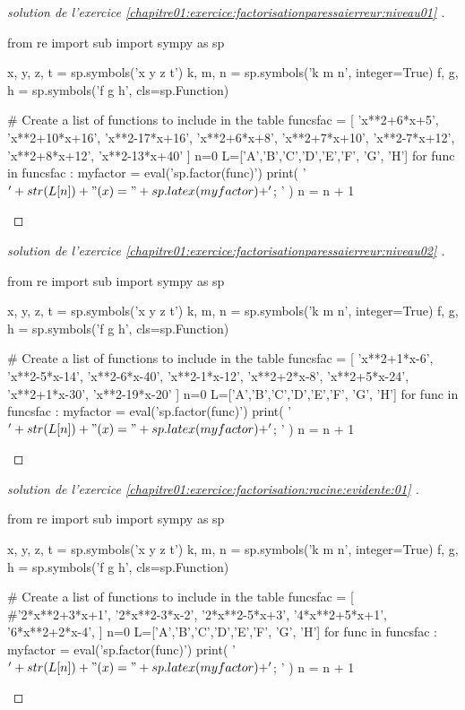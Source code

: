 \documentclass[main.tex]{subfiles}
\begin{document}
\begin{proof}[solution de l'exercice \ref{chapitre01:exercice:factorisationparessaierreur:niveau01} ] \scriptsize
\begin{pycode}
from re import sub
import sympy as sp

x, y, z, t = sp.symbols('x y z t')
k, m, n = sp.symbols('k m n', integer=True)
f, g, h = sp.symbols('f g h', cls=sp.Function)

# Create a list of functions to include in the table
funcsfac = [ 
'x**2+6*x+5',
'x**2+10*x+16',
'x**2-17*x+16',
'x**2+6*x+8',
'x**2+7*x+10', 
'x**2-7*x+12', 
'x**2+8*x+12', 
'x**2-13*x+40'
]
n=0
L=['A','B','C','D','E','F', 'G', 'H']
for func in funcsfac :  
	myfactor =  eval('sp.factor(func)')
	print( '$'+ str(L[n])  + "(x)=" + sp.latex(myfactor) + '$; ' ) 
	n     = n + 1
\end{pycode}
\end{proof}
\begin{proof}[solution de l'exercice \ref{chapitre01:exercice:factorisationparessaierreur:niveau02} ] \scriptsize
\begin{pycode}
from re import sub
import sympy as sp

x, y, z, t = sp.symbols('x y z t')
k, m, n = sp.symbols('k m n', integer=True)
f, g, h = sp.symbols('f g h', cls=sp.Function)

# Create a list of functions to include in the table
funcsfac = [ 
'x**2+1*x-6',
'x**2-5*x-14',
'x**2-6*x-40',
'x**2-1*x-12',
'x**2+2*x-8', 
'x**2+5*x-24', 
'x**2+1*x-30', 
'x**2-19*x-20'
]
n=0
L=['A','B','C','D','E','F', 'G', 'H']
for func in funcsfac :  
	myfactor =  eval('sp.factor(func)')
	print( '$'+ str(L[n])  + "(x)=" + sp.latex(myfactor) + '$; ' ) 
	n     = n + 1
\end{pycode}
\end{proof}
\begin{proof}[solution de l'exercice \ref{chapitre01:exercice:factorisation:racine:evidente:01} ]\scriptsize
\begin{pycode}
from re import sub
import sympy as sp

x, y, z, t = sp.symbols('x y z t')
k, m, n = sp.symbols('k m n', integer=True)
f, g, h = sp.symbols('f g h', cls=sp.Function)

# Create a list of functions to include in the table
funcsfac = [  
#'2*x**2+3*x+1',
'2*x**2-3*x-2',
'2*x**2-5*x+3',
'4*x**2+5*x+1', 
'6*x**2+2*x-4', 
]
n=0
L=['A','B','C','D','E','F', 'G', 'H']
for func in funcsfac :  
	myfactor =  eval('sp.factor(func)')
	print( '$'+ str(L[n])  + "(x)=" + sp.latex(myfactor) + '$; ' ) 
	n     = n + 1
\end{pycode}
\end{proof}
\newpage 
{}  
\pagestyle{scrheadings} %
\onehalfspacing
\end{document}
